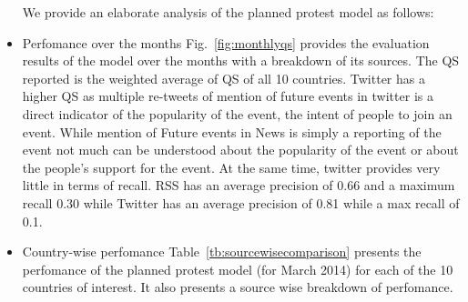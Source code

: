 \begin{itemize}
We provide an elaborate analysis of the planned protest model as follows:
\item{Perfomance over the months}
    Fig.~\ref{fig:monthlyqs} provides the evaluation results of the model over the months with a breakdown of its sources. The QS reported is the weighted average of QS of all 10 countries.
    Twitter has a higher QS as multiple re-tweets of mention of future events in twitter is a direct indicator of the popularity of the event, the intent of people to join an event. While mention of Future events in News is simply a reporting of the event not much can be understood about the popularity of the event or about the people's support for the event. At the same time, twitter provides very little in terms of recall.
RSS has an average precision of 0.66 and a maximum recall 0.30 while
Twitter has an average precision of 0.81 while a max recall of 0.1.

\item{Country-wise perfomance}
    Table~\ref{tb:sourcewisecomparison} presents the perfomance of the planned protest model (for March 2014) for each of the 10 countries of interest. It also presents a source wise breakdown of perfomance. 
\end{itemize}









